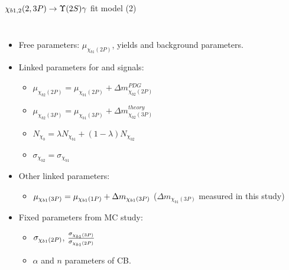 \begin{frame}{$\chi_{b1,2}(2,3P) \to \TwoS \gamma$ fit model (2)}
\begin{columns}[T]
\begin{itemize}
\item Free parameters: $\mu_{\chi_{b1}(2P)}$, yields and background parameters.
\item Linked parameters for \chibone and \chibtwo signals:
    \begin{itemize}
    \item $\mu_{\chi_{b2}(2P)} = \mu_{\chi_{b1}(2P)} + \Delta m_{\chi_{b2}(2P)}^{PDG}$
    \item $\mu_{\chi_{b2}(3P)} = \mu_{\chi_{b1}(3P)} + \Delta m_{\chi_{b2}(3P)}^{theory}$
    \item $N_{\chi_{b}} = \lambda N_{\chi_{b1}} + (1-\lambda) N_{\chi_{b2}}$
    \item $\sigma_{\chi_{b2}} = \sigma_{\chi_{b1}}$
    \end{itemize}
\item Other linked parameters:    
    \begin{itemize}
        \item $\mu_{\chi_{b 1}(3P)} = \mu_{\chi_{b 1}(1P)} + \Delta m_{\chi_{b1}(3P)}$ ($\Delta m_{\chi_{b1}(3P)}$ measured in this study)
    \end{itemize}
\item Fixed parameters from MC study:
    \begin{itemize}
    \item $\sigma_{\chi_{b 1}(2P)}$,  $\frac{\sigma_{\chi_{b 1}(3P)}}{\sigma_{\chi_{b 1}(2P)}}$
    \item $\alpha$ and $n$ parameters of CB.
    \end{itemize}
\end{itemize}
\end{columns}
\end{frame}
